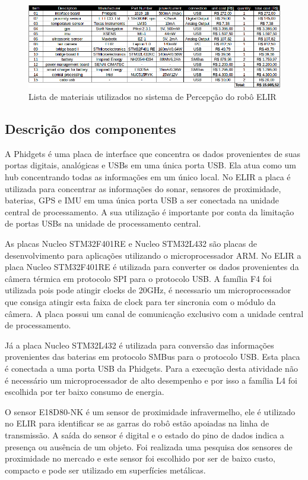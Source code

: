 \begin{figure}[h]
    \centering
    \includegraphics[width=16cm]{Figures/lista_materiais.png}
    \caption{Lista de materiais utilizados no sistema de Percepção do robô ELIR}
    \label{fig:list_mat}
\end{figure}

\subsection{Descrição dos componentes}

A Phidgets é uma placa de interface que concentra os dados provenientes de suas portas digitais, analógicas e USBs em uma única porta USB. Ela atua como um hub concentrando todas as informações em um único local. No ELIR a placa é utilizada para concentrar as informações do sonar, sensores de proximidade,  baterias, GPS e IMU em uma única porta USB a ser conectada na unidade central de processamento. A sua utilização é importante por conta da limitação de portas USBs na unidade de processamento central.

As placas Nucleo STM32F401RE  e   Nucleo STM32L432 são placas de desenvolvimento para aplicações utilizando o microprocessador ARM. No ELIR a placa Nucleo STM32F401RE é utilizada para converter os dados provenientes da câmera térmica em protocolo SPI para o protocolo USB. A família  F4 foi utilizada pois pode atingir clocks de 20GHz, é necessario um microprocessador que consiga atingir esta faixa de clock para ter sincronia com o módulo da câmera. A placa possui um canal de comunicação exclusivo com a unidade central de processamento.

Já a placa  Nucleo STM32L432 é utilizada para conversão das informações provenientes das baterias em protocolo SMBus para o protocolo USB. Esta placa é conectada a uma porta USB da Phidgets. Para a execução desta atividade não é necessário um microprocessador de alto desempenho e por isso a família L4 foi escolhida por ter  baixo consumo de energia.



O sensor E18D80-NK é um sensor de proximidade infravermelho, ele é utilizado no ELIR para identificar se as garras do robô estão apoiadas na linha de transmissão. A saída do sensor é digital e o estado do pino  de dados indica a presença ou ausência de um objeto. Foi realizada uma pesquisa dos sensores de proximidade no mercado e este sensor foi escolhido por ser de baixo custo, compacto e pode ser utilizado em superfícies metálicas.

